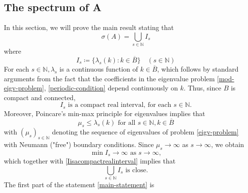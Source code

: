\documentclass[fontsize=14pt,a4paper,DIV=1]{scrartcl}
\numberwithin{equation}{section}
\newcommand{\N}{\mathbb{N}}
\begin{document}
\subsection{The spectrum of A}	

In this section, we will prove the main result stating that
	\begin{equation}
		\sigma(A) = \bigcup_{s \in \N} I_{s} \label{main-statement}
	\end{equation}
where
	\[ I_{s} \coloneqq \{ \lambda_{s}(k) : k \in \overline{B} \} \quad (s \in \N) \]
For each $s \in \N, \lambda_{s}$ is a continuous function of $k \in \overline{B}$, which follows by standard arguments from the fact that the coefficients in the eigenvalue problem \eqref{mod-eigv-problem},  \eqref{periodic-condition} depend continuously on $k$. Thus, since $B$ is compact and connected, 
	\begin{equation}
		I_{s} \text{ is a compact real interval, for each } s \in \N. \label{Iisacompactrealinterval}
	\end{equation} 
	Moreover, Poincare's min-max principle for eigenvalues implies that
	\[ \mu_{s} \leq \lambda_{s}(k) \text{ for all } s \in \N, k \in \overline{B} \]
	with $(\mu_{s})_{s \in \N}$ denoting the sequence of eigenvalues of problem \eqref{eigv-problem} with Neumann ("free") boundary conditions. Since $\mu_{s} \rightarrow \infty$ as $s \rightarrow \infty$, we obtain 
		\[ \min I_{s} \rightarrow \infty \text{ as } s \rightarrow \infty, \]
	which together with \eqref{Iisacompactrealinterval} implies that
		\[ \bigcup_{s \in \N} I_{s} \text{ is close.}\]
	The first part of the statement \eqref{main-statement} is 
\end{document}
